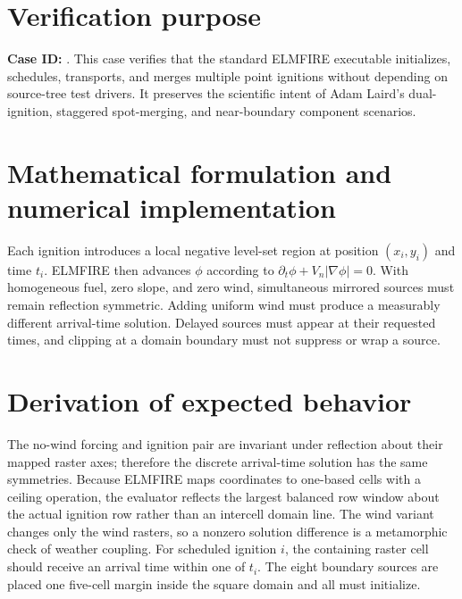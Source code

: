 \section{Verification purpose}

\textbf{Case ID:} \texttt{\CaseID}. This case verifies that the standard ELMFIRE executable initializes, schedules, transports, and merges multiple point ignitions without depending on source-tree test drivers. It preserves the scientific intent of Adam Laird's dual-ignition, staggered spot-merging, and near-boundary component scenarios.

\section{Mathematical formulation and numerical implementation}

Each ignition introduces a local negative level-set region at position $(x_i,y_i)$ and time $t_i$. ELMFIRE then advances $\phi$ according to $\partial_t\phi+V_n|\nabla\phi|=0$. With homogeneous fuel, zero slope, and zero wind, simultaneous mirrored sources must remain reflection symmetric. Adding uniform wind must produce a measurably different arrival-time solution. Delayed sources must appear at their requested times, and clipping at a domain boundary must not suppress or wrap a source.

\section{Derivation of expected behavior}

The no-wind forcing and ignition pair are invariant under reflection about their mapped raster axes; therefore the discrete arrival-time solution has the same symmetries. Because ELMFIRE maps coordinates to one-based cells with a ceiling operation, the evaluator reflects the largest balanced row window about the actual ignition row rather than an intercell domain line. The wind variant changes only the wind rasters, so a nonzero solution difference is a metamorphic check of weather coupling. For scheduled ignition $i$, the containing raster cell should receive an arrival time within one \OutputInterval{} of $t_i$. The eight boundary sources are placed one five-cell margin inside the square domain and all must initialize.

